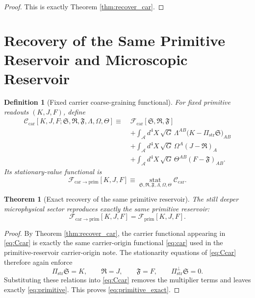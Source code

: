 \documentclass[11pt]{article}
\newcommand{\Sub}{\mathcal A}
\newcommand{\PrimFunctional}{\mathscr F_{\mathrm{prim}}}
\newcommand{\CarrierFunctional}{\mathscr F_{\mathrm{car}}}
\newcommand{\CarrierToPrim}{\mathscr F_{\mathrm{car}\to\mathrm{prim}}}
\newcommand{\PrimStrain}{K}
\newcommand{\PrimNeutral}{J}
\newcommand{\PrimFree}{F}
\newcommand{\CarrierProj}{\Pi_{\mathrm{str}}}
\newcommand{\CarrierPerp}{\Pi_{\mathrm{str}}^{\perp}}
\newcommand{\CarrierSeed}{\mathfrak S}
\newcommand{\RelabelSeed}{\mathfrak R}
\newcommand{\FreeSeed}{\mathfrak F}
\newcommand{\StrainMult}{\Lambda}
\newcommand{\NeutralMult}{\Omega}
\newcommand{\FreeMult}{\Theta}
\newtheorem{definition}{Definition}
\newtheorem{theorem}{Theorem}
\begin{document}
\begin{proof}
This is exactly Theorem \ref{thm:recover_car}.
\end{proof}

\section{Recovery of the Same Primitive Reservoir and Microscopic Reservoir}

\begin{definition}[Fixed carrier coarse-graining functional]
\label{def:car_cg}
For fixed primitive readouts \((\PrimStrain,\PrimNeutral,\PrimFree)\), define
\begin{equation}
\begin{aligned}
\mathscr C_{\mathrm{car}}
[\PrimStrain,\PrimNeutral,\PrimFree;
\CarrierSeed,\RelabelSeed,\FreeSeed,
\StrainMult,\NeutralMult,\FreeMult]
\equiv\;
&\CarrierFunctional[\CarrierSeed,\RelabelSeed,\FreeSeed]
\\
&+\int_{\Sub} d^4X\,\sqrt{G}\,
\StrainMult^{AB}\bigl(\PrimStrain-\CarrierProj\CarrierSeed\bigr)_{AB}
\\
&+\int_{\Sub} d^4X\,\sqrt{G}\,
\NeutralMult^A(\PrimNeutral-\RelabelSeed)_A
\\
&+\int_{\Sub} d^4X\,\sqrt{G}\,
\FreeMult^{AB}(\PrimFree-\FreeSeed)_{AB}.
\end{aligned}
\label{eq:Ccar}
\end{equation}
Its stationary-value functional is
\begin{equation}
\CarrierToPrim[\PrimStrain,\PrimNeutral,\PrimFree]
\equiv
\operatorname*{stat}_{\CarrierSeed,\RelabelSeed,\FreeSeed,\StrainMult,\NeutralMult,\FreeMult}
\mathscr C_{\mathrm{car}}.
\label{eq:Fcarstat}
\end{equation}
\end{definition}

\begin{theorem}[Exact recovery of the same primitive reservoir]
\label{thm:recoverprimitive}
The still deeper microphysical sector reproduces exactly the same primitive reservoir:
\begin{equation}
\CarrierToPrim[\PrimStrain,\PrimNeutral,\PrimFree]
=
\PrimFunctional[\PrimStrain,\PrimNeutral,\PrimFree].
\label{eq:primitive_exact}
\end{equation}
\end{theorem}

\begin{proof}
By Theorem \ref{thm:recover_car}, the carrier functional appearing in \eqref{eq:Ccar} is exactly the same carrier-origin functional \eqref{eq:car} used in the primitive-reservoir carrier-origin note. The stationarity equations of \eqref{eq:Ccar} therefore again enforce
\[
\CarrierProj\CarrierSeed=\PrimStrain,
\qquad
\RelabelSeed=\PrimNeutral,
\qquad
\FreeSeed=\PrimFree,
\qquad
\CarrierPerp\CarrierSeed=0.
\]
Substituting these relations into \eqref{eq:Ccar} removes the multiplier terms and leaves exactly \eqref{eq:primitive}. This proves \eqref{eq:primitive_exact}.
\end{proof}
\end{document}
